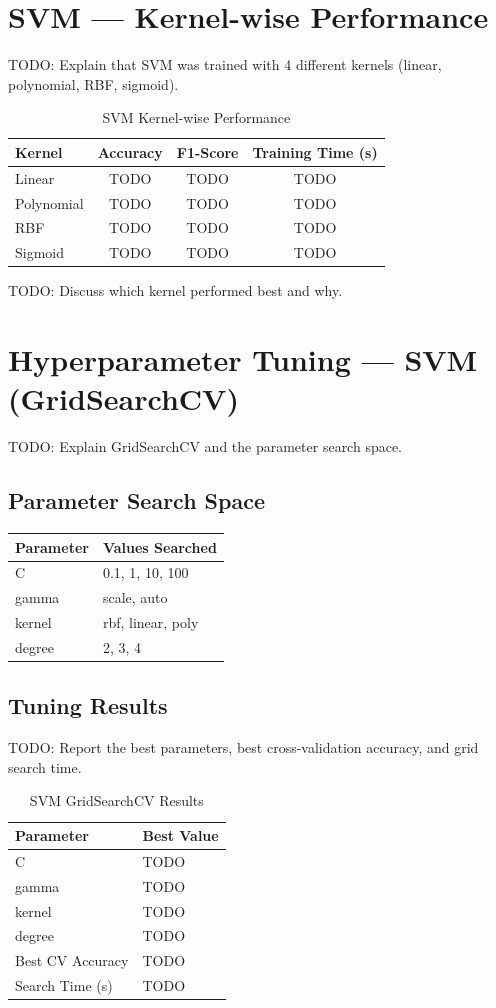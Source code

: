 \documentclass[12pt,a4paper]{article}
\begin{document}
\section{SVM — Kernel-wise Performance}
TODO: Explain that SVM was trained with 4 different kernels (linear, polynomial, RBF, sigmoid).

\begin{table}[H]
\centering
\begin{tabular}{lccc}
\toprule
\textbf{Kernel} & \textbf{Accuracy} & \textbf{F1-Score} & \textbf{Training Time (s)} \\ \midrule
Linear & TODO & TODO & TODO \\
Polynomial & TODO & TODO & TODO \\
RBF & TODO & TODO & TODO \\
Sigmoid & TODO & TODO & TODO \\
\bottomrule
\end{tabular}
\caption{SVM Kernel-wise Performance}
\end{table}

TODO: Discuss which kernel performed best and why.

\section{Hyperparameter Tuning — SVM (GridSearchCV)}
TODO: Explain GridSearchCV and the parameter search space.

\subsection{Parameter Search Space}
\begin{longtable}{|l|l|}
\hline
\textbf{Parameter} & \textbf{Values Searched} \\ \hline
C & 0.1, 1, 10, 100 \\ \hline
gamma & scale, auto \\ \hline
kernel & rbf, linear, poly \\ \hline
degree & 2, 3, 4 \\ \hline
\end{longtable}

\subsection{Tuning Results}
TODO: Report the best parameters, best cross-validation accuracy, and grid search time.

\begin{table}[H]
\centering
\begin{tabular}{ll}
\toprule
\textbf{Parameter} & \textbf{Best Value} \\ \midrule
C & TODO \\
gamma & TODO \\
kernel & TODO \\
degree & TODO \\
Best CV Accuracy & TODO \\
Search Time (s) & TODO \\
\bottomrule
\end{tabular}
\caption{SVM GridSearchCV Results}
\end{table}
\end{document}
